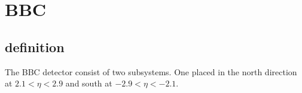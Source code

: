\documentclass{article}
\begin{document}
\section{BBC}
\subsection{definition}
The BBC detector consist of two subsystems.
One placed in the north direction at $2.1<\eta<2.9$ and south at $-2.9<\eta<-2.1$.
\end{document}
